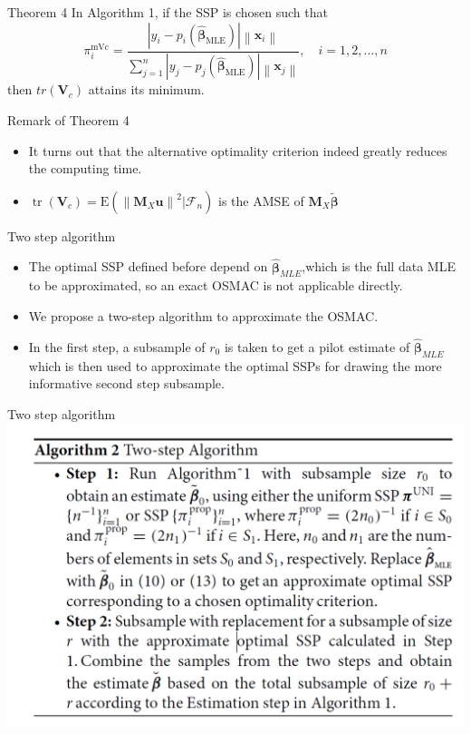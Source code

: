 \documentclass[12pt]{beamer}
\begin{document}
\begin{frame}{Theorem 4}
In Algorithm 1, if the SSP is chosen such that
$$
\pi_{i}^{\mathrm{mVc}}=\frac{\left|y_{i}-p_{i}\left(\hat{\boldsymbol{\beta}}_{\mathrm{MLE}}\right)\right|\left\|\mathbf{x}_{i}\right\|}{\sum_{j=1}^{n}\left|y_{j}-p_{j}\left(\hat{\boldsymbol{\beta}}_{\mathrm{MLE}}\right)\right|\left\|\mathbf{x}_{j}\right\|}, \quad i=1,2, \ldots, n
$$
then $tr(\mathbf{V}_c)$ attains its minimum.
\end{frame}

\begin{frame}{Remark of Theorem 4}
\begin{itemize}
\item It turns out that the alternative optimality criterion indeed greatly reduces the computing time.
\item $\operatorname{tr}\left(\mathbf{V}_{c}\right)=\mathrm{E}\left(\left\|\mathbf{M}_{X} \mathbf{u}\right\|^{2} | \mathcal{F}_{n}\right)$ is the AMSE of $\mathbf{M}_{X}\tilde{\mathbf{\beta}}$
\end{itemize}
\end{frame}


\begin{frame}{Two step algorithm}
\begin{itemize}
\item The optimal SSP defined before depend on $\hat{\mathbf{\beta}}_{MLE}$,which is the full data MLE to be approximated, so an exact OSMAC is not applicable directly.
\item We propose a two-step algorithm to approximate the
OSMAC.
\item In the first step, a subsample of $r_0$ is taken to get a pilot
estimate of $\hat{\mathbf{\beta}}_{MLE}$ which is then used to approximate the optimal
SSPs for drawing the more informative second step subsample.
\end{itemize}
\end{frame}

\begin{frame}{Two step algorithm}
\includegraphics[scale=1]{fig1.png} 
\end{frame}
\end{document}
